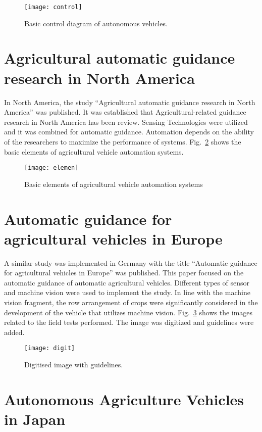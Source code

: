\begin{figure}[!h]
	\centering
	\texttt{[image: control]}
	\caption{Basic control diagram of autonomous vehicles.}
	\label{fig:con}
\end{figure}

\section{Agricultural automatic guidance research in North America}

In North America, the study “Agricultural automatic guidance research in North America” was published. It was established that Agricultural-related guidance research in North America has been review. Sensing Technologies were utilized and it was combined for automatic guidance. Automation depends on the ability of the researchers to maximize the performance of systems. Fig.~\ref{fig:elemen} shows the basic elements of agricultural vehicle automation systems.

\begin{figure}[!h]
	\centering
	\texttt{[image: elemen]}
	\caption{Basic elements of agricultural vehicle automation systems}
	\label{fig:elemen}
\end{figure}

\section{Automatic guidance for agricultural vehicles in Europe}

A similar study was implemented in Germany with the title “Automatic guidance for agricultural vehicles in Europe” was published. This paper focused on the automatic guidance of automatic agricultural vehicles. Different types of sensor and machine vision were used to implement the study. In line with the machine vision fragment, the row arrangement of crops were significantly considered in the development of the vehicle that utilizes machine vision. Fig.~\ref{fig:digit} shows the images related to the field tests performed. The image was digitized and guidelines were added.

\begin{figure}[!h]
	\centering
	\texttt{[image: digit]}
	\caption{Digitised image with guidelines.}
	\label{fig:digit}
\end{figure}

\section{Autonomous Agriculture Vehicles in Japan}

